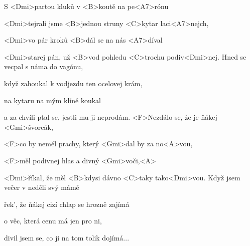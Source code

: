 

\zs
S <Dmi>partou kluků v <B>koutě na pe<A7>rónu

<Dmi>tejrali jsme <B>jednou struny <C>kytar laci<A7>nejch,

<Dmi>vo pár kroků <B>dál se na nás <A7>díval

<Dmi>starej pán, už <B>vod pohledu <C>trochu 
podiv<Dmi>nej.
\ks
\zs
Hned se vecpal s náma do vagónu,

když zahoukal k vodjezdu ten ocelovej krám,

na kytaru na mým klíně koukal

a za chvíli ptal se, jestli mu ji neprodám.
\ks
\zr
<F>Nezdálo se, že je ňákej <Gmi>švorcák,

<F>co by neměl prachy, který <Gmi>dal by za no<A>vou,

<F>měl podivnej hlas a divný <Gmi>voči,<A>

<Dmi>říkal, že měl <B>kdysi dávno <C>taky tako<Dmi>vou.
\kr
\zs
{}
\ks
\zr \kr
\zs
Když jsem večer v neděli svý mámě

řek', že ňákej cizí chlap se hrozně zajímá

o věc, která cenu má jen pro ni,

divil jsem se, co ji na tom tolik dojímá...
\ks
\kp







